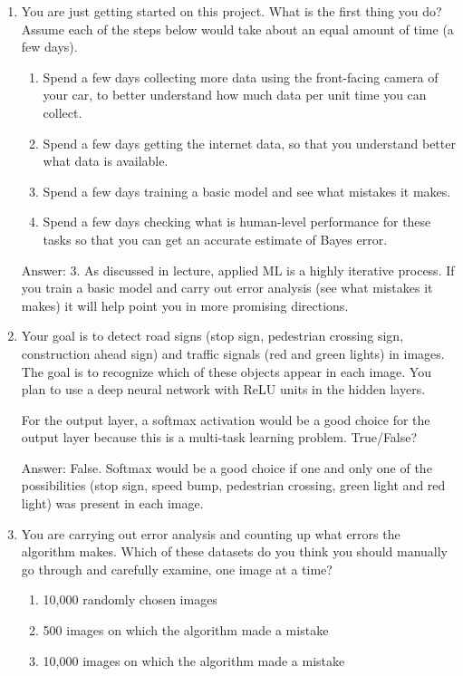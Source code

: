 \documentclass[12pt]{article}
\numberwithin{equation}{section}
\begin{document}
\begin{enumerate}
	\item You are just getting started on this project. What is the first thing you do? Assume each of the steps below would take about an equal amount of time (a few days).
	\begin{enumerate}
		\item Spend a few days collecting more data using the front-facing camera of your car, to better understand how much data per unit time you can collect.
		\item Spend a few days getting the internet data, so that you understand better what data is available.
		\item Spend a few days training a basic model and see what mistakes it makes.
		\item Spend a few days checking what is human-level performance for these tasks so that you can get an accurate estimate of Bayes error.
	\end{enumerate} \par
	Answer: 3. As discussed in lecture, applied ML is a highly iterative process. If you train a basic model and carry out error analysis (see what mistakes it makes) it will help point you in more promising directions.
	\item Your goal is to detect road signs (stop sign, pedestrian crossing sign, construction ahead sign) and traffic signals (red and green lights) in images. The goal is to recognize which of these objects appear in each image. You plan to use a deep neural network with ReLU units in the hidden layers.\par
For the output layer, a softmax activation would be a good choice for the output layer because this is a multi-task learning problem. True/False? \par
	Answer: False. Softmax would be a good choice if one and only one of the possibilities (stop sign, speed bump, pedestrian crossing, green light and red light) was present in each image.
	\item You are carrying out error analysis and counting up what errors the algorithm makes. Which of these datasets do you think you should manually go through and carefully examine, one image at a time?
	\begin{enumerate}
		\item 10,000 randomly chosen images
		\item 500 images on which the algorithm made a mistake
		\item 10,000 images on which the algorithm made a mistake

\end{enumerate}
\end{enumerate}
\end{document}
